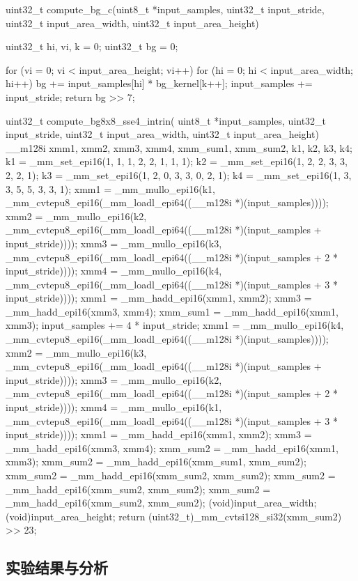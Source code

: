   \begin{codeblock}[language=C]
uint32_t compute_bg_c(uint8_t *input_samples,
                        uint32_t input_stride,
                        uint32_t input_area_width,
                        uint32_t input_area_height)
{
    uint32_t hi, vi, k = 0;
    uint32_t bg = 0;

    for (vi = 0; vi < input_area_height; vi++) {
        for (hi = 0; hi < input_area_width; hi++) {
            bg += input_samples[hi] * bg_kernel[k++];
        }
        input_samples += input_stride;
    }
    return bg >> 7;
}
uint32_t compute_bg8x8_sse4_intrin(
uint8_t *input_samples,
uint32_t input_stride,
uint32_t input_area_width,
uint32_t input_area_height)
{
    __m128i xmm1, xmm2, xmm3, xmm4, xmm_sum1, xmm_sum2, k1, k2, k3, k4;
    k1 = _mm_set_epi16(1, 1, 1, 2, 2, 1, 1, 1);
    k2 = _mm_set_epi16(1, 2, 2, 3, 3, 2, 2, 1);
    k3 = _mm_set_epi16(1, 2, 0, 3, 3, 0, 2, 1);
    k4 = _mm_set_epi16(1, 3, 3, 5, 5, 3, 3, 1);
    xmm1 = _mm_mullo_epi16(k1, _mm_cvtepu8_epi16(_mm_loadl_epi64((__m128i *)(input_samples))));
    xmm2 = _mm_mullo_epi16(k2, _mm_cvtepu8_epi16(_mm_loadl_epi64((__m128i *)(input_samples + input_stride))));
    xmm3 = _mm_mullo_epi16(k3, _mm_cvtepu8_epi16(_mm_loadl_epi64((__m128i *)(input_samples + 2 * input_stride))));
    xmm4 = _mm_mullo_epi16(k4, _mm_cvtepu8_epi16(_mm_loadl_epi64((__m128i *)(input_samples + 3 * input_stride))));
    xmm1     = _mm_hadd_epi16(xmm1, xmm2);
    xmm3     = _mm_hadd_epi16(xmm3, xmm4);
    xmm_sum1 = _mm_hadd_epi16(xmm1, xmm3);
    input_samples += 4 * input_stride;
    xmm1 = _mm_mullo_epi16(k4, _mm_cvtepu8_epi16(_mm_loadl_epi64((__m128i *)(input_samples))));
    xmm2 = _mm_mullo_epi16(k3, _mm_cvtepu8_epi16(_mm_loadl_epi64((__m128i *)(input_samples + input_stride))));
    xmm3 = _mm_mullo_epi16(k2, _mm_cvtepu8_epi16(_mm_loadl_epi64((__m128i *)(input_samples + 2 * input_stride))));
    xmm4 = _mm_mullo_epi16(k1, _mm_cvtepu8_epi16(_mm_loadl_epi64((__m128i *)(input_samples + 3 * input_stride))));
    xmm1     = _mm_hadd_epi16(xmm1, xmm2);
    xmm3     = _mm_hadd_epi16(xmm3, xmm4);
    xmm_sum2 = _mm_hadd_epi16(xmm1, xmm3);
    xmm_sum2 = _mm_hadd_epi16(xmm_sum1, xmm_sum2);
    xmm_sum2 = _mm_hadd_epi16(xmm_sum2, xmm_sum2);
    xmm_sum2 = _mm_hadd_epi16(xmm_sum2, xmm_sum2);
    xmm_sum2 = _mm_hadd_epi16(xmm_sum2, xmm_sum2);
    (void)input_area_width;
    (void)input_area_height;
    return (uint32_t)_mm_cvtsi128_si32(xmm_sum2) >> 23;
}
  \end{codeblock}
  \subsection{实验结果与分析}

